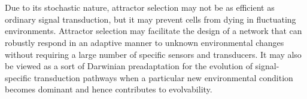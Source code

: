 \\
\\
\noindent
Due to its stochastic nature, attractor selection may not be as efficient as ordinary signal transduction, but it may prevent cells from dying in fluctuating environments. Attractor selection may facilitate the design of a network that can robustly respond in an adaptive manner to unknown environmental changes without requiring a large number of specific sensors and transducers. 
It may also be viewed as a sort of Darwinian preadaptation for the evolution of signal- specific transduction pathways when a particular new environmental condition becomes dominant and hence contributes to evolvability. 



